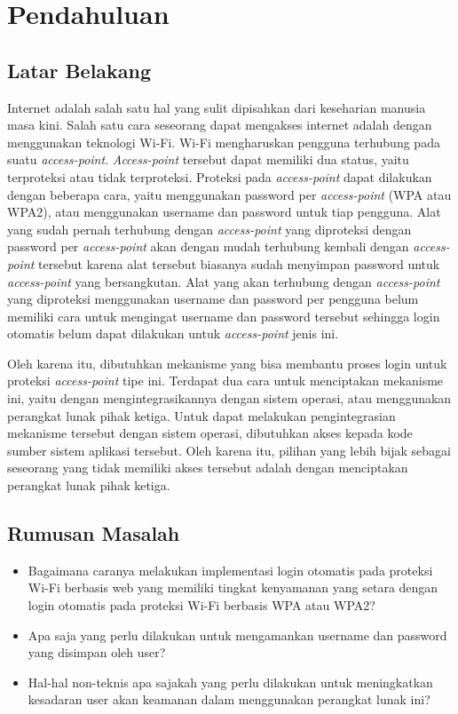 \chapter{Pendahuluan}



\section{Latar Belakang}

Internet adalah salah satu hal yang sulit dipisahkan dari keseharian manusia masa kini. Salah satu cara seseorang dapat mengakses internet adalah dengan menggunakan teknologi Wi-Fi. Wi-Fi mengharuskan pengguna terhubung pada suatu \textit{access-point}. \textit{Access-point} tersebut dapat memiliki dua status, yaitu terproteksi atau tidak terproteksi. Proteksi pada \textit{access-point} dapat dilakukan dengan beberapa cara, yaitu menggunakan password per \textit{access-point} (WPA atau WPA2), atau menggunakan username dan password untuk tiap pengguna. Alat yang sudah pernah terhubung dengan \textit{access-point} yang diproteksi dengan password per \textit{access-point} akan dengan mudah terhubung kembali dengan \textit{access-point} tersebut karena alat tersebut biasanya sudah menyimpan password untuk \textit{access-point} yang bersangkutan. Alat yang akan terhubung dengan \textit{access-point} yang diproteksi menggunakan username dan password per pengguna belum memiliki cara untuk mengingat username dan password tersebut sehingga login otomatis belum dapat dilakukan untuk \textit{access-point} jenis ini.

Oleh karena itu, dibutuhkan mekanisme yang bisa membantu proses login untuk proteksi \textit{access-point} tipe ini. Terdapat dua cara untuk menciptakan mekanisme ini, yaitu dengan mengintegrasikannya dengan sistem operasi, atau menggunakan perangkat lunak pihak ketiga. Untuk dapat melakukan pengintegrasian mekanisme tersebut dengan sistem operasi, dibutuhkan akses kepada kode sumber sistem aplikasi tersebut. Oleh karena itu, pilihan yang lebih bijak sebagai seseorang yang tidak memiliki akses tersebut adalah dengan menciptakan perangkat lunak pihak ketiga.



\section{Rumusan Masalah}

\begin{itemize}
	\item{Bagaimana caranya melakukan implementasi login otomatis pada proteksi Wi-Fi berbasis web yang memiliki tingkat kenyamanan yang setara dengan login otomatis pada proteksi Wi-Fi berbasis WPA atau WPA2?}
	\item{Apa saja yang perlu dilakukan untuk mengamankan username dan password yang disimpan oleh user?}
	\item{Hal-hal non-teknis apa sajakah yang perlu dilakukan untuk meningkatkan kesadaran user akan keamanan dalam menggunakan perangkat lunak ini?}
\end{itemize}



